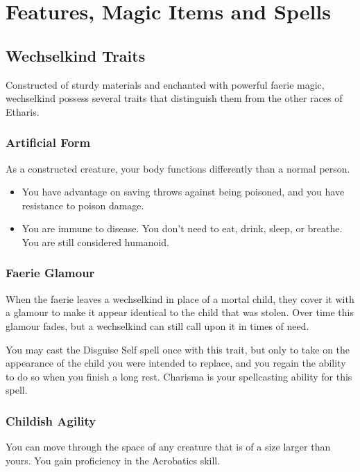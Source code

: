 \documentclass[letterpaper,openany,oneside,twocolumn]{book}
\begin{document}
\onecolumn


\rendercharactersheet

\renderbackgroundsheet

\renderspellsheet


\restoregeometry
\twocolumn

\chapter*{Features, Magic Items and Spells}

\section*{Wechselkind Traits}
Constructed of sturdy materials and enchanted with powerful faerie magic, wechselkind possess several traits that distinguish them from the other races of Etharis.
\subsection*{Artificial Form}
As a constructed creature, your body functions differently than a normal person.
\begin{itemize}
	\item You have advantage on saving throws against being poisoned, and you have resistance to poison damage.
	\item You are immune to disease. You don't need to eat, drink, sleep, or breathe. You are still considered humanoid.
\end{itemize}
\subsection*{Faerie Glamour}
When the faerie leaves a wechselkind in place of a mortal child, they cover it with a glamour to make it appear identical to the child that was stolen. Over time this glamour fades, but a wechselkind can still call upon it in times of need.

You may cast the Disguise Self spell once with this trait, but only to take on the appearance of the child you were intended to replace, and you regain the ability to do so when you finish a long rest. Charisma is your spellcasting ability for this spell.
\subsection*{Childish Agility}
You can move through the space of any creature that is of a size larger than yours. You gain proficiency in the Acrobatics skill.
\end{document}
